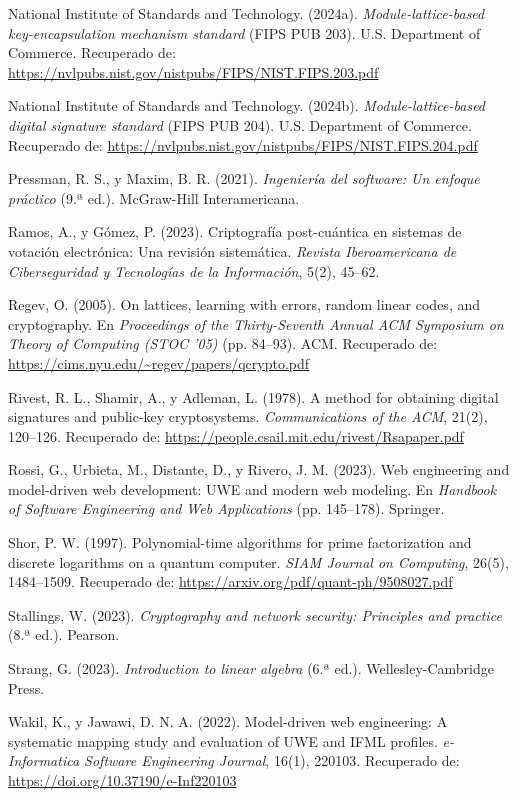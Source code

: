 \begin{flushleft}
	\hangindent=1.25cm
	National Institute of Standards and Technology. (2024a). \textit{Module-lattice-based key-encapsulation mechanism standard} (FIPS PUB 203). U.S. Department of Commerce. Recuperado de: \url{https://nvlpubs.nist.gov/nistpubs/FIPS/NIST.FIPS.203.pdf}

	\hangindent=1.25cm
	National Institute of Standards and Technology. (2024b). \textit{Module-lattice-based digital signature standard} (FIPS PUB 204). U.S. Department of Commerce. Recuperado de: \url{https://nvlpubs.nist.gov/nistpubs/FIPS/NIST.FIPS.204.pdf}

	\hangindent=1.25cm
	Pressman, R. S., y Maxim, B. R. (2021). \textit{Ingeniería del software: Un enfoque práctico} (9.ª ed.). McGraw-Hill Interamericana.

	\hangindent=1.25cm
	Ramos, A., y Gómez, P. (2023). Criptografía post-cuántica en sistemas de votación electrónica: Una revisión sistemática. \textit{Revista Iberoamericana de Ciberseguridad y Tecnologías de la Información}, 5(2), 45--62.

	\hangindent=1.25cm
	Regev, O. (2005). On lattices, learning with errors, random linear codes, and cryptography. En \textit{Proceedings of the Thirty-Seventh Annual ACM Symposium on Theory of Computing (STOC '05)} (pp. 84--93). ACM. Recuperado de: \url{https://cims.nyu.edu/~regev/papers/qcrypto.pdf}

	\hangindent=1.25cm
	Rivest, R. L., Shamir, A., y Adleman, L. (1978). A method for obtaining digital signatures and public-key cryptosystems. \textit{Communications of the ACM}, 21(2), 120--126. Recuperado de: \url{https://people.csail.mit.edu/rivest/Rsapaper.pdf}

	\hangindent=1.25cm
	Rossi, G., Urbieta, M., Distante, D., y Rivero, J. M. (2023). Web engineering and model-driven web development: UWE and modern web modeling. En \textit{Handbook of Software Engineering and Web Applications} (pp. 145--178). Springer.

	\hangindent=1.25cm
	Shor, P. W. (1997). Polynomial-time algorithms for prime factorization and discrete logarithms on a quantum computer. \textit{SIAM Journal on Computing}, 26(5), 1484--1509. Recuperado de: \url{https://arxiv.org/pdf/quant-ph/9508027.pdf}

	\hangindent=1.25cm
	Stallings, W. (2023). \textit{Cryptography and network security: Principles and practice} (8.ª ed.). Pearson.

	\hangindent=1.25cm
	Strang, G. (2023). \textit{Introduction to linear algebra} (6.ª ed.). Wellesley-Cambridge Press.

	\hangindent=1.25cm
	Wakil, K., y Jawawi, D. N. A. (2022). Model-driven web engineering: A systematic mapping study and evaluation of UWE and IFML profiles. \textit{e-Informatica Software Engineering Journal}, 16(1), 220103. Recuperado de: \url{https://doi.org/10.37190/e-Inf220103}

\end{flushleft}